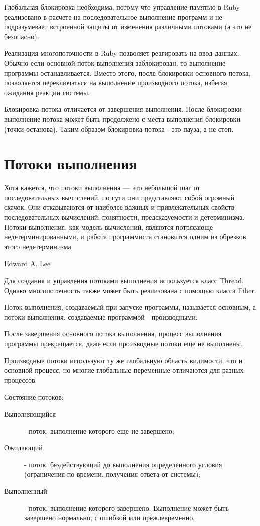 Глобальная блокировка необходима, потому что управление памятью в Ruby реализовано в расчете на последовательное выполнение программ и не подразумевает встроенной защиты от изменения различными потоками (а это не безопасно). 

Реализация многопоточности в Ruby позволяет реагировать на ввод данных. Обычно если основной поток выполнения заблокирован, то выполнение программы останавливается. Вместо этого, после блокировки основного потока, позволяется переключаться на выполнение производного потока, избегая ожидания реакции системы.

\begin{note}
  Блокировка потока отличается от завершения выполнения. После блокировки выполнение потока может быть продолжено с места выполнения блокировки (точки останова). Таким образом блокировка потока - это пауза, а не стоп.
\end{note}

\section{Потоки выполнения}

\epigraph
{Хотя кажется, что потоки выполнения — это небольшой шаг от последовательных вычислений, по сути они представляют собой огромный скачок. Они отказываются от наиболее важных и привлекательных свойств последовательных вычислений: понятности, предсказуемости и детерминизма. Потоки выполнения, как модель вычислений, являются потрясающе недетерминированными, и работа программиста становится одним из обрезков этого недетерминизма.}
{Edward A. Lee}

Для создания и управления потоками выполнения используется класс Thread. Однако многопоточность также может быть реализована с помощью класса Fiber.

Поток выполнения, создаваемый при запуске программы, называется основным, а потоки выполнения, создаваемые программой - производными.

После завершения основного потока выполнения, процесс выполнения программы прекращается, даже если производные потоки еще не выполнены.

Производные потоки используют ту же глобальную область видимости, что и основной процесс, но многие глобальные переменные отличаются для разных процессов.

Состояние потоков:
\begin{description}
  \item[Выполняющийся] - поток, выполнение которого еще не завершено; 
  \item[Ожидающий] - поток, бездействующий до выполнения определенного условия (ограничения по времени, получения ответа от системы);
  \item[Выполненный] - поток, выполнение которого завершено. Выполнение может быть завершено нормально, с ошибкой или преждевременно.
\end{description}


